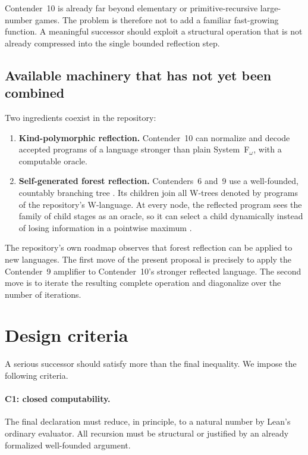 \documentclass[11pt]{article}
\theoremstyle{definition}
\theoremstyle{remark}
\newcommand{\lean}[1]{\texttt{\detokenize{#1}}}
\begin{document}
Contender~10 is already far beyond elementary or primitive-recursive
large-number games. The problem is therefore not to add a familiar fast-growing
function. A meaningful successor should exploit a structural operation that is
not already compressed into the single bounded reflection step.

\subsection{Available machinery that has not yet been combined}

Two ingredients coexist in the repository:

\begin{enumerate}[leftmargin=*]
\item \textbf{Kind-polymorphic reflection.} Contender~10 can normalize and
  decode accepted programs of a language stronger than plain System~F$_\omega$,
  with a computable oracle.
\item \textbf{Self-generated forest reflection.} Contenders~6 and~9 use a
  well-founded, countably branching tree \lean{index}. Its children join all
  W-trees denoted by programs of the repository's W-language. At every node,
  the reflected program sees the family of child stages as an oracle, so it can
  select a child dynamically instead of losing information in a pointwise
  maximum \cite{BusyLeanC6,BusyLeanC9}.
\end{enumerate}

The repository's own roadmap observes that forest reflection can be applied to
new languages. The first move of the present proposal is precisely to apply the
Contender~9 amplifier to Contender~10's stronger reflected language. The second
move is to iterate the resulting complete operation and diagonalize over the
number of iterations.

\section{Design criteria}

A serious successor should satisfy more than the final inequality. We impose the
following criteria.

\paragraph{C1: closed computability.}
The final declaration must reduce, in principle, to a natural number by Lean's
ordinary evaluator. All recursion must be structural or justified by an already
formalized well-founded argument.
\end{document}
